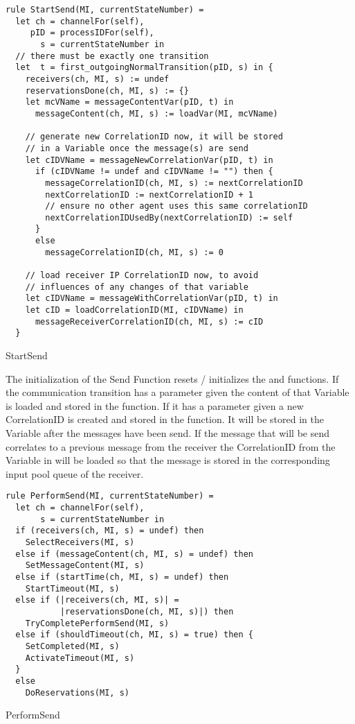 \begin{listing}[htbp]
\begin{verbatim}
rule StartSend(MI, currentStateNumber) =
  let ch = channelFor(self),
     pID = processIDFor(self),
       s = currentStateNumber in
  // there must be exactly one transition
  let  t = first_outgoingNormalTransition(pID, s) in {
    receivers(ch, MI, s) := undef
    reservationsDone(ch, MI, s) := {}
    let mcVName = messageContentVar(pID, t) in
      messageContent(ch, MI, s) := loadVar(MI, mcVName)

    // generate new CorrelationID now, it will be stored
    // in a Variable once the message(s) are send
    let cIDVName = messageNewCorrelationVar(pID, t) in
      if (cIDVName != undef and cIDVName != "") then {
        messageCorrelationID(ch, MI, s) := nextCorrelationID
        nextCorrelationID := nextCorrelationID + 1
        // ensure no other agent uses this same correlationID
        nextCorrelationIDUsedBy(nextCorrelationID) := self
      }
      else
        messageCorrelationID(ch, MI, s) := 0

    // load receiver IP CorrelationID now, to avoid
    // influences of any changes of that variable
    let cIDVName = messageWithCorrelationVar(pID, t) in
    let cID = loadCorrelationID(MI, cIDVName) in
      messageReceiverCorrelationID(ch, MI, s) := cID
  }
\end{verbatim}
\caption{StartSend}
\label{lst:shortasm:StartSend}
\end{listing}


The initialization of the Send Function resets / initializes the  and
 functions.
If the communication transition has a  parameter given the
content of that Variable is loaded and stored in the 
function. If it has a  parameter given
a new CorrelationID is created and stored in the  function.
It will be stored in the Variable after the messages have been send.
If the message that will be send correlates to a previous message from the receiver
the CorrelationID from the Variable in  will be loaded
so that the message is stored in the corresponding input pool queue of the receiver.


\begin{listing}[htbp]
\begin{verbatim}
rule PerformSend(MI, currentStateNumber) =
  let ch = channelFor(self),
       s = currentStateNumber in
  if (receivers(ch, MI, s) = undef) then
    SelectReceivers(MI, s)
  else if (messageContent(ch, MI, s) = undef) then
    SetMessageContent(MI, s)
  else if (startTime(ch, MI, s) = undef) then
    StartTimeout(MI, s)
  else if (|receivers(ch, MI, s)| =
           |reservationsDone(ch, MI, s)|) then
    TryCompletePerformSend(MI, s)
  else if (shouldTimeout(ch, MI, s) = true) then {
    SetCompleted(MI, s)
    ActivateTimeout(MI, s)
  }
  else
    DoReservations(MI, s)
\end{verbatim}
\caption{PerformSend}
\label{lst:shortasm:PerformSend}
\end{listing}



